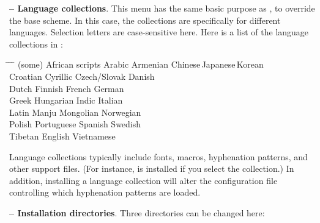 \documentclass{article}
\begin{document}
\textbf{ -- Language collections}.  This menu has the same
basic purpose as , to override the base scheme.  In this case,
the collections are specifically for different languages.  Selection
letters are case-sensitive here.  Here is a list of the language
collections in \TL:

\begin{tabbing}
\hspace{.25\linewidth} \=
\hspace{.25\linewidth} \=
\hspace{.25\linewidth} \=
\hspace{.25\linewidth} \kill
(some) African scripts \>
Arabic \>
Armenian \>
Chinese\,Japanese\,Korean \\
Croatian \>
Cyrillic \>
Czech/Slovak \>
Danish \\
Dutch \>
Finnish \>
French \>
German \\
Greek \>
Hungarian \>
Indic \>
Italian \\
Latin \>
Manju \>
Mongolian \>
Norwegian \\
Polish \>
Portuguese \>
Spanish \>
Swedish \\
Tibetan \>
 English \>
Vietnamese \\
\end{tabbing}

\noindent Language collections typically include fonts, macros,
hyphenation patterns, and other support files.  (For instance,
 is installed if you select the 
collection.)  In addition, installing a language collection will alter
the  configuration file controlling which
hyphenation patterns are loaded.

\textbf{ -- Installation directories}.  Three directories can
be changed here:
\label{text:instdir}
\end{document}
